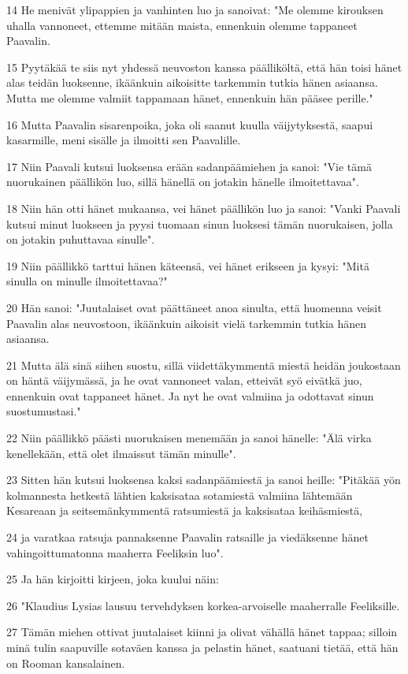 \par 14 He menivät ylipappien ja vanhinten luo ja sanoivat: "Me olemme kirouksen uhalla vannoneet, ettemme mitään maista, ennenkuin olemme tappaneet Paavalin.
\par 15 Pyytäkää te siis nyt yhdessä neuvoston kanssa päälliköltä, että hän toisi hänet alas teidän luoksenne, ikäänkuin aikoisitte tarkemmin tutkia hänen asiaansa. Mutta me olemme valmiit tappamaan hänet, ennenkuin hän pääsee perille."
\par 16 Mutta Paavalin sisarenpoika, joka oli saanut kuulla väijytyksestä, saapui kasarmille, meni sisälle ja ilmoitti sen Paavalille.
\par 17 Niin Paavali kutsui luoksensa erään sadanpäämiehen ja sanoi: "Vie tämä nuorukainen päällikön luo, sillä hänellä on jotakin hänelle ilmoitettavaa".
\par 18 Niin hän otti hänet mukaansa, vei hänet päällikön luo ja sanoi: "Vanki Paavali kutsui minut luokseen ja pyysi tuomaan sinun luoksesi tämän nuorukaisen, jolla on jotakin puhuttavaa sinulle".
\par 19 Niin päällikkö tarttui hänen käteensä, vei hänet erikseen ja kysyi: "Mitä sinulla on minulle ilmoitettavaa?"
\par 20 Hän sanoi: "Juutalaiset ovat päättäneet anoa sinulta, että huomenna veisit Paavalin alas neuvostoon, ikäänkuin aikoisit vielä tarkemmin tutkia hänen asiaansa.
\par 21 Mutta älä sinä siihen suostu, sillä viidettäkymmentä miestä heidän joukostaan on häntä väijymässä, ja he ovat vannoneet valan, etteivät syö eivätkä juo, ennenkuin ovat tappaneet hänet. Ja nyt he ovat valmiina ja odottavat sinun suostumustasi."
\par 22 Niin päällikkö päästi nuorukaisen menemään ja sanoi hänelle: "Älä virka kenellekään, että olet ilmaissut tämän minulle".
\par 23 Sitten hän kutsui luoksensa kaksi sadanpäämiestä ja sanoi heille: "Pitäkää yön kolmannesta hetkestä lähtien kaksisataa sotamiestä valmiina lähtemään Kesareaan ja seitsemänkymmentä ratsumiestä ja kaksisataa keihäsmiestä,
\par 24 ja varatkaa ratsuja pannaksenne Paavalin ratsaille ja viedäksenne hänet vahingoittumatonna maaherra Feeliksin luo".
\par 25 Ja hän kirjoitti kirjeen, joka kuului näin:
\par 26 "Klaudius Lysias lausuu tervehdyksen korkea-arvoiselle maaherralle Feeliksille.
\par 27 Tämän miehen ottivat juutalaiset kiinni ja olivat vähällä hänet tappaa; silloin minä tulin saapuville sotaväen kanssa ja pelastin hänet, saatuani tietää, että hän on Rooman kansalainen.
